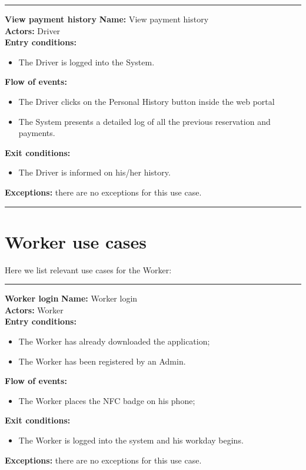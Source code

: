 \begin{center}
\noindent\rule{8cm}{1.0pt}
\end{center}



\textbf{\large View payment history}
\bigbreak
\textbf{Name:} View payment history\\
\textbf{Actors:} Driver \\
\textbf{Entry conditions:} 
\begin{itemize}
\item The Driver is logged into the System.
\end{itemize}
\textbf{Flow of events:} 
\begin{itemize}
\item The Driver clicks on the Personal History button inside the web portal
\item The System presents a detailed log of all the previous reservation and payments.
\end{itemize}
\textbf{Exit conditions:} 
\begin{itemize}
\item The Driver is informed on his/her history.
\end{itemize}
\textbf{Exceptions:} there are no exceptions for this use case.\\


\begin{center}
\noindent\rule{8cm}{1.0pt}
\end{center}



\section{Worker use cases}
Here we list relevant use cases for the Worker:\\
\begin{center}
\noindent\rule{8cm}{1.0pt}
\end{center}


\textbf{\large Worker login}
\bigbreak
\textbf{Name:} Worker login \\
\textbf{Actors:} Worker \\
\textbf{Entry conditions:} 
\begin{itemize}
\item The Worker has already downloaded the application;
\item The Worker has been registered by an Admin.
\end{itemize}
\textbf{Flow of events:} 
\begin{itemize}
\item The Worker places the NFC badge on his phone;
\end{itemize}
\textbf{Exit conditions:} 
\begin{itemize}
\item The Worker is logged into the system and his workday begins.
\end{itemize}
\textbf{Exceptions:} there are no exceptions for this use case.\\


